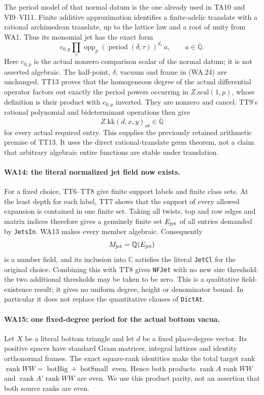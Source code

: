 The period model of that normal datum is the one already used
in TA10 and VI9--VI11.  Finite additive approximation identifies
a finite-adelic translate with a rational archimedean translate,
up to the lattice law and a root of unity from WA1.  Thus its
monomial jet has the exact form
\[
 c_{0,p}\prod_\tau
     \operatorname{opp}_p(\operatorname{period}(\delta,\tau))
                         ^{d_\tau}\,a,
                      \qquad a\in\overline{\mathbb Q}.      \tag{WA.24}
\]
Here $c_{0,p}$ is the actual nonzero comparison scalar of the normal datum;
it is not asserted algebraic.  The half-point, $\delta$, vacuum
and frame in (WA.24) are unchanged.  TT13 proves that the
homogeneous degree of the actual differential operator factors
out exactly the period powers occurring in
$Z.\mathrm{scal}(1,p)$, whose definition is their product with
$c_{0,p}$ inverted.  They are nonzero and cancel.  TT9's rational
polynomial and bideterminant operations then give
\[
                  Z.\mathrm{kk}(d,x,y)_{ab}
                                \in\overline{\mathbb Q}     \tag{WA.25}
\]
for every actual required entry.  This supplies the previously
retained arithmetic premise of TT13.  It uses the direct
rational-translate germ theorem, not a claim that arbitrary
algebraic entire functions are stable under translation.

\paragraph{WA14: the literal normalized jet field now exists.}
For a fixed choice, TT6--TT8 give finite support labels and
finite class sets.  At the least depth for each label, TT7
shows that the support of every allowed expansion is contained
in one finite set.  Taking all twists, top and row edges and
matrix indices therefore gives a genuinely finite set
$E_{\rm jet}$ of all entries demanded by \texttt{JetsIn}.
WA13 makes every member algebraic.  Consequently
\[
                   M_{\rm jet}=\mathbb Q(E_{\rm jet})
\]
is a number field, and its inclusion into $\mathbb C$ satisfies
the literal \texttt{JetCl} for the original choice.  Combining
this with TT8 gives \texttt{NFJet} with no new size threshold:
the two additional thresholds may be taken to be zero.  This
is a qualitative field-existence result; it gives no uniform
degree, height or denominator bound.  In particular it does
not replace the quantitative clauses of \texttt{DictAt}.

\paragraph{WA15: one fixed-degree period for the actual bottom vacua.}
Let $X$ be a literal bottom triangle and let $d$ be a fixed
place-degree vector.  Its positive spaces have standard Gram
matrices, integral lattices and identity orthonormal frames.
The exact square-rank identities make the total target rank
$\operatorname{rank}WW=\operatorname{botBig}+\operatorname{botSmall}$
even.  Hence both products
$\operatorname{rank}A\operatorname{rank}WW$ and
$\operatorname{rank}A'\operatorname{rank}WW$ are even.  We use
this product parity, not an assertion that both source ranks
are even.

